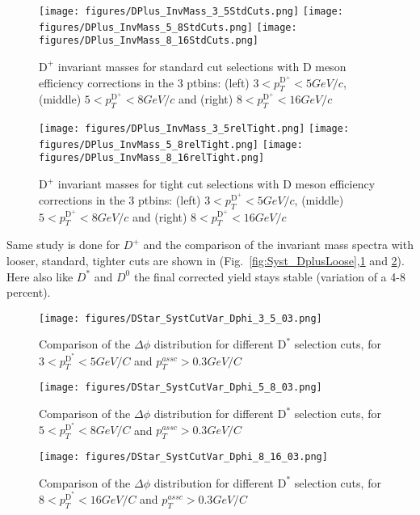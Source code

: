 \begin{figure}[h]
\centering
{\texttt{[image: figures/DPlus\_InvMass\_3\_5StdCuts.png]}}
{\texttt{[image: figures/DPlus\_InvMass\_5\_8StdCuts.png]}}
{\texttt{[image: figures/DPlus\_InvMass\_8\_16StdCuts.png]}}
 \caption{$\text{D}^+$ invariant masses for standard cut selections with D meson efficiency corrections in the 3 ptbins: (left) $3< p_{T}^{\text{D}^+}< 5 GeV/c$, (middle) $5< p_{T}^{\text{D}^+}< 8 GeV/c$ and (right) $8< p_{T}^{\text{D}^+}< 16 GeV/c$}
\label{fig:Syst_DplusStd}
\end{figure}

\begin{figure}[h]
\centering
{\texttt{[image: figures/DPlus\_InvMass\_3\_5relTight.png]}}
{\texttt{[image: figures/DPlus\_InvMass\_5\_8relTight.png]}}
{\texttt{[image: figures/DPlus\_InvMass\_8\_16relTight.png]}}
 \caption{$\text{D}^+$ invariant masses for tight cut selections with D meson efficiency corrections in the 3 ptbins: (left) $3< p_{T}^{\text{D}^+}< 5 GeV/c$, (middle) $5< p_{T}^{\text{D}^+}< 8 GeV/c$ and (right) $8< p_{T}^{\text{D}^+}< 16 GeV/c$}
\label{fig:Syst_DplusTight}
\end{figure}

Same study is done for $D^+$ and the comparison of the invariant mass spectra with looser, standard, tighter cuts are shown in (Fig.~\ref{fig:Syst_DplusLoose},\ref{fig:Syst_DplusStd} and \ref{fig:Syst_DplusTight}). Here also like  $D^*$ and  $D^0$ the final corrected yield stays stable (variation of a 4-8 percent). \ \\

\newpage

\begin{figure}[h]
\centering
{\texttt{[image: figures/DStar\_SystCutVar\_Dphi\_3\_5\_03.png]}}
 \caption{Comparison of the $\Delta\phi$ distribution for different $\text{D}^*$ selection cuts, for $3< p_{T}^{\text{D}^*}< 5 GeV/C$ and $p_{T}^{assc}>0.3 GeV/C$ }
\label{fig:Syst_DStarCutVarSystlowpt}
\end{figure}
\begin{figure}[h]
\centering
{\texttt{[image: figures/DStar\_SystCutVar\_Dphi\_5\_8\_03.png]}}
 \caption{Comparison of the $\Delta\phi$ distribution for different $\text{D}^*$ selection cuts, for $5< p_{T}^{\text{D}^*}< 8 GeV/C$ and $p_{T}^{assc}>0.3 GeV/C$ }
\label{fig:Syst_DStarCutVarSystmidpt}
\end{figure}
\begin{figure}[h]
\centering
{\texttt{[image: figures/DStar\_SystCutVar\_Dphi\_8\_16\_03.png]}}
 \caption{Comparison of the $\Delta\phi$ distribution for different $\text{D}^*$ selection cuts, for $8< p_{T}^{\text{D}^*}< 16 GeV/C$ and $p_{T}^{assc}>0.3 GeV/C$ }
\label{fig:Syst_DStarCutVarSysthighpt}
\end{figure}

